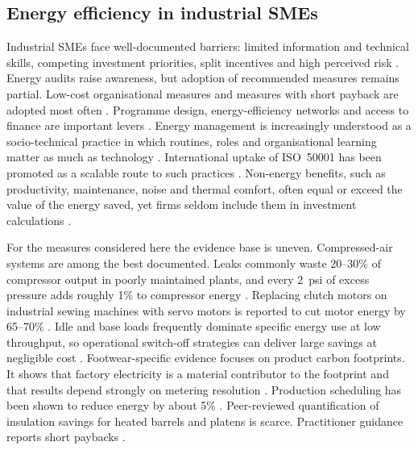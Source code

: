 \documentclass[preprint,12pt,authoryear]{elsarticle}
\begin{document}
\subsection{Energy efficiency in industrial SMEs}
Industrial SMEs face well-documented barriers: limited information and technical skills, competing investment priorities, split incentives and high perceived risk \citep{cagno2013,trianni2017}. Energy audits raise awareness, but adoption of recommended measures remains partial. Low-cost organisational measures and measures with short payback are adopted most often \citep{fleiter2012,kalantzis2019}. Programme design, energy-efficiency networks and access to finance are important levers \citep{johansson2019,jalo2021,herce2024,zhang2025credit}. Energy management is increasingly understood as a socio-technical practice in which routines, roles and organisational learning matter as much as technology \citep{thollander2025}. International uptake of ISO~50001 has been promoted as a scalable route to such practices \citep{mckane2017,moreno2026}. Non-energy benefits, such as productivity, maintenance, noise and thermal comfort, often equal or exceed the value of the energy saved, yet firms seldom include them in investment calculations \citep{worrell2003,nehler2016,nehler2018}.

For the measures considered here the evidence base is uneven. Compressed-air systems are among the best documented. Leaks commonly waste 20--30\% of compressor output in poorly maintained plants, and every 2~psi of excess pressure adds roughly 1\% to compressor energy \citep{doe2016compressed,saidur2010,dindorf2012}. Replacing clutch motors on industrial sewing machines with servo motors is reported to cut motor energy by 65--70\% \citep{nemesa2023}. Idle and base loads frequently dominate specific energy use at low throughput, so operational switch-off strategies can deliver large savings at negligible cost \citep{mouzon2007,kara2011,gutowski2009}. Footwear-specific evidence focuses on product carbon footprints. It shows that factory electricity is a material contributor to the footprint and that results depend strongly on metering resolution \citep{mila1998,cheah2013,zhang2026}. Production scheduling has been shown to reduce energy by about 5\% \citep{sudhakar2025}. Peer-reviewed quantification of insulation savings for heated barrels and platens is scarce. Practitioner guidance reports short paybacks \citep{kent2018}.
\end{document}

